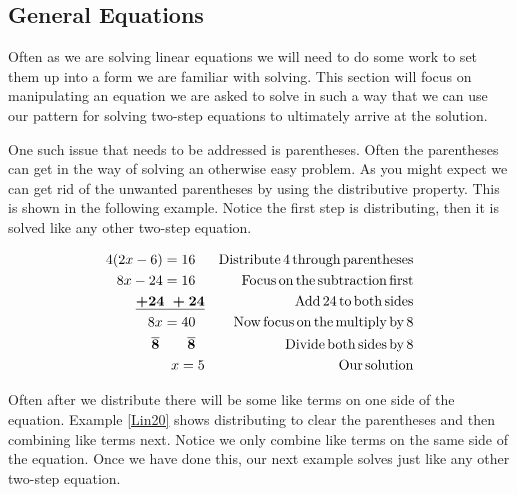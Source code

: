 \subsection{General Equations}\pp

 {}\pp

 Often as we are solving linear equations we will need to do some work to set
them up into a form we are familiar with solving. This section will focus on
manipulating an equation we are asked to solve in such a way that we can use
our pattern for solving two-step equations to ultimately arrive at the
solution.\pp

 One such issue that needs to be addressed is parentheses. Often the
parentheses can get in the way of solving an otherwise easy problem. As you
might expect we can get rid of the unwanted parentheses by using the
distributive property. This is shown in the following example. Notice the
first step is distributing, then it is solved like any other two-step
equation.

\begin{example}\label{Lin19}
  
  \begin{eqnarray*}
    4 (2 x - 6) = 16~~ &  & \operatorname{Distribute} 4 \operatorname{through}
    \operatorname{parentheses}\\
    8 x - 24 = 16~~ &  & \operatorname{Focus} \operatorname{on} \operatorname{the} \operatorname{subtraction}
    \operatorname{first}\\
    \boldsymbol{\underline{+ 24 ~+ 24}} &  & \operatorname{Add} 24 \operatorname{to} \operatorname{both}
    \operatorname{sides}\\
    8 x = 40~~ &  & \operatorname{Now} \operatorname{focus} \operatorname{on} \operatorname{the} \operatorname{multiply}
    \operatorname{by} 8\\
    \boldsymbol{ \overline{8} ~~~~~~ \overline{8}}~~ &  & \operatorname{Divide} \operatorname{both}
    \operatorname{sides} \operatorname{by} 8\\
    x = 5 &  & \operatorname{Our} \operatorname{solution}
  \end{eqnarray*}
\end{example}

 Often after we distribute there will be some like terms on one side of the
equation. Example \ref{Lin20} shows distributing to clear the parentheses and then
combining like terms next. Notice we only combine like terms on the same side
of the equation. Once we have done this, our next example solves just like any
other two-step equation.

